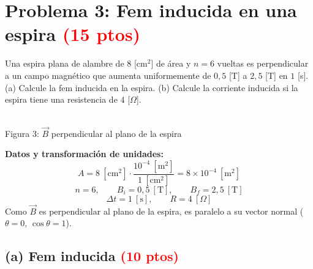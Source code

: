 \documentclass[12pt,letterpaper]{article}
\newcommand{\ptos}[1]{\textcolor{red}{\textbf{(#1 ptos)}}}
\newcommand{\punto}[2][black]{%
  \draw[#1,line width=0.8pt,fill=white] (#2) circle (0.22);
  \fill[#1] (#2) circle (0.05);}
\begin{document}
\newpage
\section*{Problema 3: Fem inducida en una espira \textcolor{red}{(15 ptos)}}

\noindent Una espira plana de alambre de $8$ [cm$^2$] de \'area y $n = 6$ vueltas es perpendicular a
un campo magn\'etico que aumenta uniformemente de $0{,}5$ [T] a $2{,}5$ [T] en $1$ [s].
(a) Calcule la fem inducida en la espira. (b) Calcule la corriente inducida si la espira tiene una
resistencia de $4$ [$\Omega$].

\medskip

\noindent
\begin{minipage}[c]{0.36\textwidth}
\centering
{}\\[2pt]
{\footnotesize Figura 3: $\vec{B}$ perpendicular al plano de la espira}
\end{minipage}%
\hfill
\begin{minipage}[c]{0.60\textwidth}
\textbf{Datos y transformaci\'on de unidades:}
\[
    A = 8\ [\text{cm}^2]\cdot\frac{10^{-4}\ [\text{m}^2]}{1\ [\text{cm}^2]} = 8\times10^{-4}\ [\text{m}^2]
\]
\[
    n = 6,\qquad B_i = 0{,}5\ [\text{T}],\qquad B_f = 2{,}5\ [\text{T}]
\]
\[
    \Delta t = 1\ [\text{s}],\qquad R = 4\ [\Omega]
\]
Como $\vec{B}$ es perpendicular al plano de la espira, es paralelo a su vector normal
($\theta = 0$, $\cos\theta = 1$).
\end{minipage}

\subsection*{(a) Fem inducida \ptos{10}}
\end{document}
